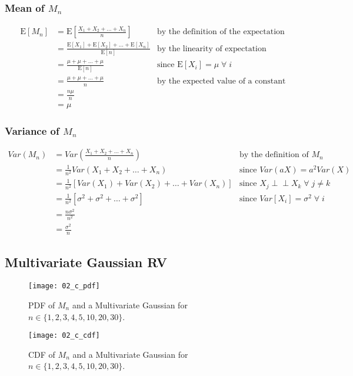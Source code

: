 \documentclass[12pt, a4paper, titlepage, fleqn]{article}
\begin{document}
\subsubsection{Mean of $M_n$}
\begin{align}
	\text{E}[M_n] &= \text{E}[\frac{X_1+X_2+\dots+X_n}{n}] &\text{by the definition of the expectation}	
	\\
	&= \frac{\text{E}[X_1]+\text{E}[X_2]+\dots+\text{E}[X_n]}{\text{E}[n]}	&\text{by the linearity of expectation}
	\\
	&= \frac{\mu+\mu+\dots+\mu}{\text{E}[n]}	&\text{since E$[X_i]=\mu \; \forall \; i$}
	\\
	&= \frac{\mu+\mu+\dots+\mu}{n}	&\text{by the expected value of a constant}
	\\
	&= \frac{n\mu}{n}
	\\
	&= \mu
\end{align}
	
\subsubsection{Variance of $M_n$}
\begin{align}
	Var(M_n) &= Var(\frac{X_1+X_2+\dots+X_n}{n}) &\text{by the definition of $M_n$}
	\\
	&= \frac{1}{n^2}Var(X_1+X_2+\dots+X_n) &\text{since $Var(aX)=a^2Var(X)$}
	\\
	&= \frac{1}{n^2}[Var(X_1)+Var(X_2)+\dots+Var(X_n)] &\text{since $X_j \perp\!\!\!\perp X_k \; \forall \; j \neq k$}
	\\
	&= \frac{1}{n^2}[\sigma^2 + \sigma^2 + \dots + \sigma^2] &\text{since $Var[X_i]=\sigma^2 \; \forall \; i$}
	\\
	&= \frac{n\sigma^2}{n^2} 
	\\
	&= \frac{\sigma^2}{n}
\end{align}

\pagebreak

\subsection{Multivariate Gaussian RV}

\begin{figure}[h!]
	\centering
	\texttt{[image: 02\_c\_pdf]}
	\vspace{-24pt}
	\caption{PDF of $M_n$ and a Multivariate Gaussian for $n \in \{1,2,3,4,5,10,20,30\}$.} 
	\label{fig:gaussian pdf}
	\vspace{16pt}
	\texttt{[image: 02\_c\_cdf]}
	\vspace{-24pt}
	\caption{CDF of $M_n$ and a Multivariate Gaussian for $n \in \{1,2,3,4,5,10,20,30\}$.}
	\label{fig:gaussian cdf}
\end{figure}
\end{document}
